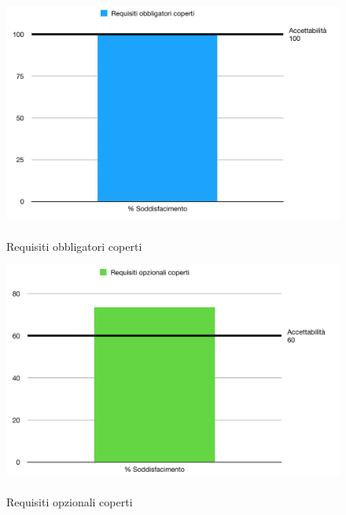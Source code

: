 \begin{minipage}[t]{0.25\textwidth}
	\begin{figure}[H]
		\includegraphics[scale=0.3]{./images/grafici_RQ/reqObbCop.png} 
		\caption{\-\\Requisiti obbligatori coperti}
	\end{figure}
\end{minipage}
\begin{minipage}[t]{0.25\textwidth}
	\begin{figure}[H]
		\includegraphics[scale=0.3]{./images/grafici_RQ/reqOpzCop.png} 
		\caption{\-\\Requisiti opzionali coperti}
	\end{figure}
\end{minipage}
